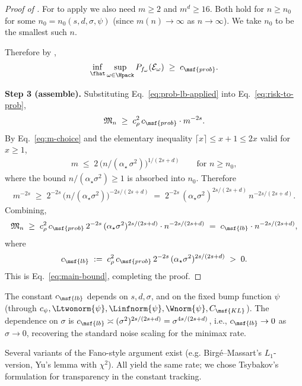 \begin{proof}[Proof of ]
For  to apply we also need $m \geq 2$ and $m^d \geq 16$. Both hold for $n \geq n_0$ for some $n_0 = n_0(s, d, \sigma, \psi)$ (since $m(n) \to \infty$ as $n \to \infty$). We take $n_0$ to be the smallest such $n$.

Therefore by ,
\begin{align}\label{eq:prob-lb-applied}
\inf_{\fhat} \sup_{\omega \in \Hpack} P_{f_\omega}(\mathcal{E}_\omega)
\;\geq\; c_{\msf{prob}}.
\end{align}

\smallskip\noindent\textbf{Step 3 (assemble).}
Substituting Eq.~\eqref{eq:prob-lb-applied} into Eq.~\eqref{eq:risk-to-prob},
\begin{align*}
\mathfrak{M}_n
\;\geq\;
c_\rho^2 \, c_{\msf{prob}} \cdot m^{-2s}.
\end{align*}
By Eq.~\eqref{eq:m-choice} and the elementary inequality $\lceil x \rceil \leq x + 1 \leq 2 x$ valid for $x \geq 1$,
\begin{align}\label{eq:m-upper}
m \;\leq\; 2 \, \bigl( n / (\alpha_\star \, \sigma^2) \bigr)^{1/(2s+d)}
\qquad\text{for } n \geq n_0,
\end{align}
where the bound $n / (\alpha_\star \sigma^2) \geq 1$ is absorbed into $n_0$. Therefore
\begin{align}\label{eq:m-lower}
m^{-2s}
\;\geq\; 2^{-2s} \, \bigl( n / (\alpha_\star \sigma^2) \bigr)^{-2s/(2s+d)}
\;=\; 2^{-2s} \, (\alpha_\star \sigma^2)^{2s/(2s+d)} \, n^{-2s/(2s+d)}.
\end{align}
Combining,
\begin{align*}
\mathfrak{M}_n
\;\geq\; c_\rho^2 \, c_{\msf{prob}} \, 2^{-2s} \, (\alpha_\star \sigma^2)^{2s/(2s+d)} \cdot n^{-2s/(2s+d)}
\;=\; c_{\msf{lb}} \cdot n^{-2s/(2s+d)},
\end{align*}
where
\begin{align*}
c_{\msf{lb}} \;:=\; c_\rho^2 \, c_{\msf{prob}} \, 2^{-2s} \, (\alpha_\star \sigma^2)^{2s/(2s+d)} \;>\; 0.
\end{align*}
This is Eq.~\eqref{eq:main-bound}, completing the proof.
\end{proof}

\begin{remark}\label{rem:constants}
The constant $c_{\msf{lb}}$ depends on $s, d, \sigma$, and on the fixed bump function $\psi$ (through $c_\psi, \Ltwonorm{\psi}, \Linfnorm{\psi}, \Wnorm{\psi}, C_{\msf{KL}}$). The dependence on $\sigma$ is $c_{\msf{lb}} \asymp (\sigma^2)^{2s/(2s+d)} = \sigma^{4s/(2s+d)}$, i.e., $c_{\msf{lb}} \to 0$ as $\sigma \to 0$, recovering the standard noise scaling for the minimax rate.
\end{remark}

\begin{remark}\label{rem:alt-fano}
Several variants of the Fano-style argument exist (e.g. Birgé--Massart's $L_1$-version, Yu's lemma with $\chi^2$). All yield the same rate; we chose Tsybakov's formulation for transparency in the constant tracking.
\end{remark}

